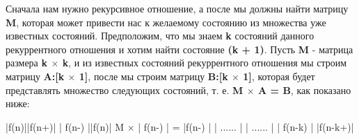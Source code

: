 \vspace{\baselineskip}
Сначала нам нужно рекурсивное отношение, а после  мы должны найти матрицу \textbf{M}, которая может привести нас к желаемому состоянию из множества уже известных состояний. Предположим, что мы знаем \textbf{k} состояний данного рекуррентного отношения и хотим найти состояние \textbf{(k + 1)}. Пусть \textbf{M} - матрица размера \textbf{k $\times$ k}, и из известных состояний рекуррентного отношения мы строим матрицу \textbf{A:[k $\times$ 1]}, после мы строим матрицу \textbf{B:[k $\times$ 1]}, которая будет представлять множество следующих состояний, т. е. \textbf{M $\times$ A = B}, как показано ниже:
\begin{tcolorbox}
  
\hspace{12mm} |\hspace{3,5mm}f(n)\hspace{4,4mm}|\hspace{12,5mm}|\hspace{2,5mm}f(n+)\hspace{3mm}|\newline
\hspace*{13,3mm}|\hspace{1mm} f(n-)\hspace{1mm} |\hspace{12,2mm}|\hspace{4mm}f(n)\hspace{7mm}|\newline
\hspace*{3,5mm}M $\times$ |\hspace*{1mm} f(n-) \hspace*{1mm}|\hspace*{2,5mm}  = \hspace*{2,5mm} |\hspace*{3,2mm}f(n-)\hspace*{2,8mm} |\newline
\hspace*{13,3mm}|\hspace*{3mm} ...... \hspace*{2,4mm}|  \hspace*{9,5mm}   |\hspace*{3mm} ...... \hspace*{3,7mm} |\newline
\hspace*{13,3mm}|\hspace*{1,1mm} f(n-k)\hspace*{1,1mm} | \hspace*{9,3mm} |\hspace*{1,1mm}f(n-k+)\hspace*{1,1mm}|

\end{tcolorbox}

